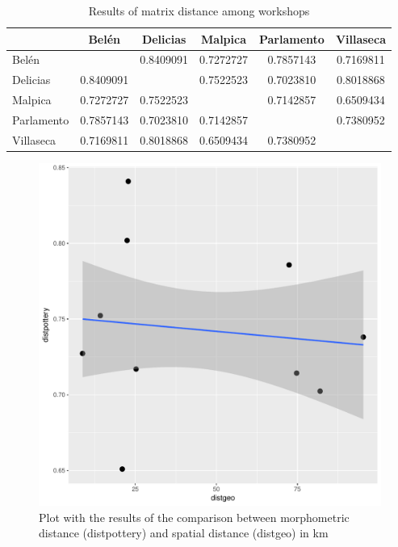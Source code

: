 \documentclass[review]{elsarticle}
\begin{document}
\begin{table}[htp]
\begin{tabular}{lccccc}
\hline
        & Bel\'en   &   Delicias & Malpica & Parlamento & Villaseca\\ \hline
Bel\'en   &         &   0.8409091&0.7272727&0.7857143   &0.7169811  \\
Delicias&0.8409091&            &0.7522523&0.7023810   &0.8018868   \\
Malpica &0.7272727&0.7522523   &         &0.7142857   &0.6509434    \\
Parlamento&0.7857143&0.7023810&0.7142857&            &0.7380952     \\
Villaseca&0.7169811&0.8018868&0.6509434&0.7380952    &                \\
\hline

\end{tabular}
\caption{Results of matrix distance among workshops}
\label{table:spatialdistance}
\end{table}

\begin{figure}[htp]
	\centering
\includegraphics[scale=0.60]{spatgeo.pdf}
\caption{Plot with the results of the comparison between morphometric distance (distpottery) and spatial distance (distgeo) in km}
\label{spatgeo}
\end{figure} 
\end{document}
